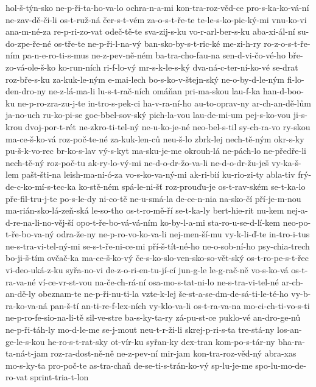 {hol-š-týn-sko
ne-p-ři-ta-ho-va-lo
ochra-n-a-mi
kon-tra-roz-věd-ce
pro-s-ka-ko-vá-ní
ne-zav-dě-či-li
os-t-ruž-ná
čer-s-t-vém
za-o-s-t-ře-te
te-le-s-ko-pic-ký-mi
vnu-ko-vi
ana-m-né-za
re-p-ri-zo-vat
odeč-tě-te
sva-zij-s-ku
vo-r-arl-ber-s-ku
aba-xi-ál-ní
su-do-zpe-ře-né
os-tře-te
ne-p-ři-l-na-vý
ban-sko-by-s-t-ric-ké
me-zi-h-ry
ro-z-o-s-t-ře-ním
pa-n-e-ro-ti-s-mus
ne-z-pev-ně-ném
ba-tra-cho-fau-na
sen-d-vi-čo-vé-ho
bře-zo-vá-ole-š-ko
ko-run-ních
ri-f-lo-vý
mr-s-k-le-s-ký
dva-ná-c-ter-ní-ko-vé
se-drat
roz-bře-s-ku
za-kuk-le-ným
e-mai-lech
bo-s-ko-v-štejn-ský
ne-o-by-d-le-ným
fi-lo-den-dro-ny
ne-z-lá-ma-li
lu-s-t-rač-ních
omáňan
pri-ma-skou
lau-f-ka
han-d-boo-ku
ne-p-ro-zra-zu-j-te
in-tro-s-pek-ci
ha-v-ra-ní-ho
au-to-oprav-ny
ar-ch-an-dě-lům
ja-no-uch
ru-ko-pi-se
goe-bbel-sov-ský
pich-la-vou
lau-de-mi-um
pej-s-ko-vou
ji-s-krou
dvoj-por-t-rét
ne-zkro-ti-tel-ný
ne-u-ko-je-né
neo-bel-s-til
sy-ch-ra-vo
ry-skou
ma-ce-š-ko-vá
roz-poč-te-né
za-kuk-len-ců
neu-š-lo
zbrk-lej
nech-tě-ným
okr-s-ky
pu-š-k-vo-rec
br-ko-s-lav
vý-s-kyt
ma-sku-je-me
okrouh-lá
ne-pách-lo
ne-předře-li
nech-tě-ný
roz-poč-tu
ak-ry-lo-vý-mi
ne-d-o-dr-žo-va-li
ne-d-o-dr-žu-ješ
vy-ka-š-lem
pašt-šti-na
leish-ma-ni-ó-za
vo-s-ko-va-ný-mi
ak-ri-bií
ku-rio-zi-ty
abla-tiv
frý-de-c-ko-mí-s-tec-ka
ko-stě-ném
spá-le-ni-šť
roz-prouďu-je
os-t-rav-ském
se-t-ka-lo
pře-fil-tru-j-te
po-s-le-dy
ni-co-tě
ne-u-smá-la
de-ce-n-nia
na-sko-čí
pří-je-m-nou
ma-rián-sko-lá-zeň-ská
le-so-tho
os-t-ro-mě-ří
se-t-ka-ly
bert-hie-rit
nu-kem
nej-a-d-re-na-li-no-věj-ší
opo-t-ře-bo-vá-vá-ním
ko-by-l-a-mi
sta-ro-u-se-d-lí-kem
neo-po-t-ře-bo-va-ný
odra-že-ny
ne-p-ro-vo-ko-va-li
nej-men-ší-mu
vy-k-li-ď-te
in-tro-i-tus
ne-s-tra-vi-tel-ný-mi
se-s-t-ře-ni-ce-mi
pří-š-tít-né-ho
ne-o-sob-ní-ho
psy-chia-trech
bo-ji-š-tím
ovčač-ka
ma-ce-š-ko-vý
če-s-ko-slo-ven-sko-so-vět-ský
os-t-ro-pe-s-t-řec
vi-deo-uká-z-ku
syřa-no-vi
de-z-o-ri-en-tu-jí-cí
jun-g-le
le-g-rač-ně
vo-s-ko-vá
os-t-ra-va-né
ví-ce-vr-st-vou
na-če-ch-rá-ní
osa-mo-s-tat-ni-lo
ne-s-tra-vi-tel-né
ar-ch-an-dě-ly
obeznam-te
ne-p-ři-nu-ti-la
vzte-k-lej
še-st-a-se-dm-de-sá-ti-le-té-ho
vy-b-ra-ko-va-ná
pan-š-tí
an-ti-re-f-lex-ních
vy-klo-va-li
os-t-ra-va-na
mo-ci-ch-ti-vo-s-ti
ne-p-ro-fe-sio-na-li-tě
sil-ve-stre
ba-s-ky-ta-ry
zá-pu-st-ce
puklo-vé
an-dro-ge-nů
ne-p-ři-táh-ly
mo-d-le-me
se-j-mout
neu-t-r-ži-li
skrej-p-ri-s-ta
tre-stá-ny
los-an-ge-le-s-kou
he-ro-s-t-rat-sky
ot-vír-ku
syřan-ky
dex-tran
kom-po-s-tár-ny
bha-ra-ta-ná-t-jam
roz-ra-dost-ně-ně
ne-z-pev-ní
mir-jam
kon-tra-roz-věd-ný
abra-xas
mo-s-ky-ta
pro-poč-te
as-tra-chaň
de-se-ti-s-trán-ko-vý
sp-lu-je-me
spo-lu-mo-de-ro-vat
sprint-tria-t-lon
}
